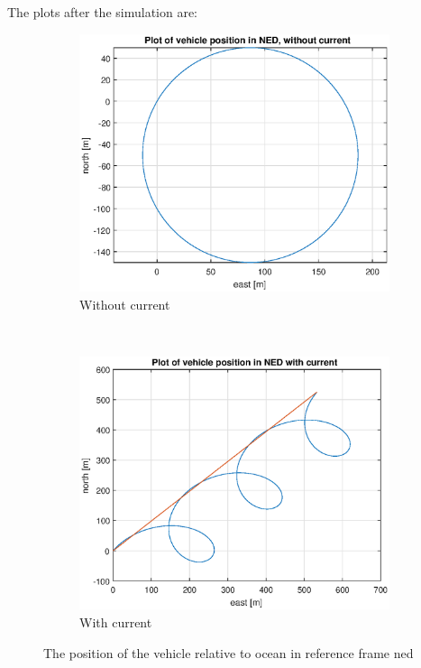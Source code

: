 The plots after the simulation are:

\begin{figure}[!ht]
	\centering
	\begin{subfigure}[b]{0.45\textwidth}
		\includegraphics[width=\textwidth]{figures/4_pos.eps}
		\caption{Without current}
	\end{subfigure}
	~ %
	\begin{subfigure}[b]{0.45\textwidth}
		\includegraphics[width=\textwidth]{figures/4_pos_current}
		\caption{With current}
	\end{subfigure}
	\label{fig:4_pos}
	\caption{The position of the vehicle relative to ocean in reference frame ned}
\end{figure}

